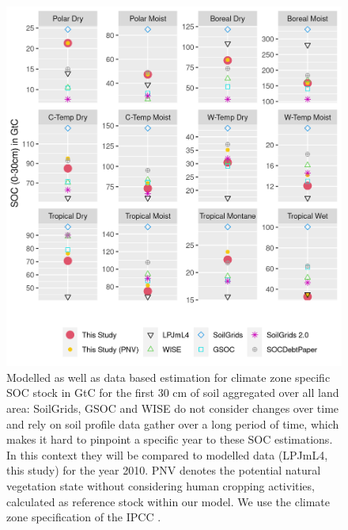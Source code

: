 \documentclass[gc, manuscript]{copernicus}
\begin{document}
\begin{figure}[h]
\includegraphics[width=13cm]{../ResultNotebooks/Output/Images/reg_comparisonfigure.png} 
\caption{Modelled as well as data based estimation for climate zone specific SOC stock in GtC for the first 30 cm of soil aggregated over all land area: SoilGrids, GSOC and WISE do not consider changes over time and rely on soil profile data gather over a long period of time, which makes it hard to pinpoint a specific year to these SOC estimations. In this context they will be compared to modelled data (LPJmL4, this study) for the year 2010. PNV denotes the potential natural vegetation state without considering human cropping activities, calculated as reference stock within our model. We use the climate zone specification of the IPCC \citep{eggleston_ipcc_2006}.}
\label{fig:SOCreg}
\end{figure}
\end{document}
